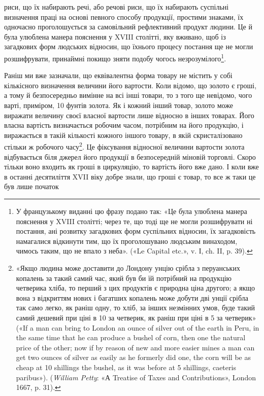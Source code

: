 риси, що їх набирають речі, або речові риси, що їх набирають
суспільні визначення праці на основі певного способу продукції,
простими знаками, їх одночасно проголошується за самовільний
рефлективний продукт людини. Це й була улюблена манера
пояснення у XVIII столітті, яку вживано, щоб із загадкових
форм людських відносин, що їхнього процесу постання ще не
могли розшифрувати, принаймні покищо зняти подобу чогось
незрозумілого\footnote*{
У французькому виданні цю фразу подано так: «Це була улюблена
манера пояснення у XVIII столітті; через те, що тоді ще не могли розшифрувати
ні постання, ані розвитку загадкових форм суспільних відносин,
їх загадковість намагалися відкинути тим, що їх проголошувано
людським винаходом, чимось таким, що не впало з неба». («Le Capital
etc.», v. І, ch. II, p. 39). 
}.

Раніш ми вже зазначали, що еквівалентна форма товару не
містить у собі кількісного визначення величини його вартости.
Коли відомо, що золото є гроші, а тому й безпосередньо вимінне
на всі інші товари, то з того ще невідомо, чого варті, приміром,
10 фунтів золота. Як і кожний інший товар, золото може виражати
величину своєї власної вартости лише відносно в інших товарах.
Його власна вартість визначається робочим часом, потрібним
на його продукцію, і виражається в такій кількості кожного
іншого товару, в якій скристалізовано стільки ж робочого часу\footnote{
«Якщо людина може доставити до Лондону унцію срібла з перуанських
копалень за такий самий час, який був би їй потрібний на продукцію
четверика хліба, то перший з цих продуктів є природна ціна другого;
а якщо вона з відкриттям нових і багатших копалень може добути дві
унції срібла так само легко, як раніш одну, то хліб, за інших незмінних
умов, буде такий самий дешевий при ціні в 10 за четверик, як
раніш при ціні в 5 за четверик» («If a man can bring to London
an ounce of silver out of the earth in Peru, in the same time that he can
produce a bushel of corn, then one the natural price of the other; now if
by reason of new and more easier mines a man can get two ounces of silver
as easily as he formerly did one, the corn will be as cheap at 10 shillings
the bushel, as it was before at 5 shillings, caeteris paribus»). (\emph{William
Petty}: «А Treatise of Taxes and Contributions», London 1667, p. 31).
}.
Це фіксування відносної величини вартости золота відбувається
біля джерел його продукції в безпосередній міновій торговлі.
Скоро тільки воно входить як гроші в циркуляцію, то вартість
його вже дано. І коли вже в останні десятиліття XVII віку
добре знали, що гроші є товар, то все ж таки це був лише початок
\parbreak{}  %
